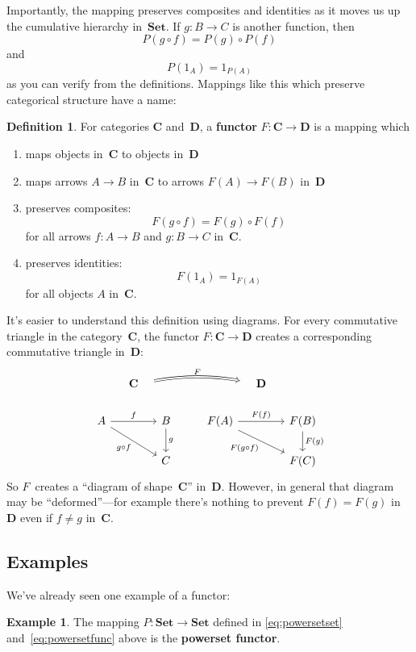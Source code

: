 \documentclass[letterpaper,12pt]{article}
\newcommand{\after}{\circ}
\newcommand{\cat}[1]{\mathbf{#1}}
\newcommand{\Set}{\cat{Set}}
\newcommand{\textdefn}{\textbf}
\theoremstyle{definition}
\newtheorem{defn}[equation]{Definition}
\newtheorem{exmp}[equation]{Example}
\theoremstyle{plain}
\numberwithin{equation}{section}
\begin{document}
Importantly, the mapping preserves composites and identities as it moves us up the cumulative hierarchy in~\(\Set\). If \(g:B\to C\) is another function, then
\[P(g\after f)=P(g)\after P(f)\]
and
\[P(1_A)=1_{P(A)}\]
as you can verify from the definitions. Mappings like this which preserve categorical structure have a name:
\begin{defn}
For categories \(\cat{C}\) and~\(\cat{D}\), a \textdefn{functor} \(F:\cat{C}\to\cat{D}\) is a mapping which
\begin{enumerate}[label=(\roman*)]
\item maps objects in~\(\cat{C}\) to objects in~\(\cat{D}\)
\item maps arrows \(A\to B\) in~\(\cat{C}\) to arrows \(F(A)\to F(B)\) in~\(\cat{D}\)
\item preserves composites:
\[F(g\after f)=F(g)\after F(f)\]
for all arrows \(f:A\to B\) and \(g:B\to C\) in~\(\cat{C}\).
\item preserves identities:
\[F(1_A)=1_{F(A)}\]
for all objects \(A\) in~\(\cat{C}\).
\end{enumerate}
\end{defn}
\noindent It's easier to understand this definition using diagrams. For every commutative triangle in the category~\(\cat{C}\), the functor \(F:\cat{C}\to\cat{D}\) creates a corresponding commutative triangle in~\(\cat{D}\):
\begin{equation}
\begin{tikzcd}[column sep=small]
& \cat{C} \ar[rrrr, Rightarrow, shorten=1em, bend left=10, "F"] &&&& \cat{D} & \\
A \ar[rrd, "g\after f"'] \ar[rr,"f"] && B \ar[d,"g"] && F(A) \ar[rrd, "F(g\after f)"'] \ar[rr,"F(f)"] && F(B) \ar[d,"F(g)"] \\
  && C && && F(C)
\end{tikzcd}
\end{equation}
So \(F\)~creates a ``diagram of shape~\(\cat{C}\)'' in~\(\cat{D}\). However, in general that diagram may be ``deformed''---for example there's nothing to prevent \(F(f)=F(g)\) in~\(\cat{D}\) even if \(f\ne g\) in~\(\cat{C}\).

\subsection{Examples}
We've already seen one example of a functor:
\begin{exmp}
The mapping \(P:\Set\to\Set\) defined in \eqref{eq:powersetset} and~\eqref{eq:powersetfunc} above is the \textdefn{powerset functor}.
\end{exmp}
\end{document}
